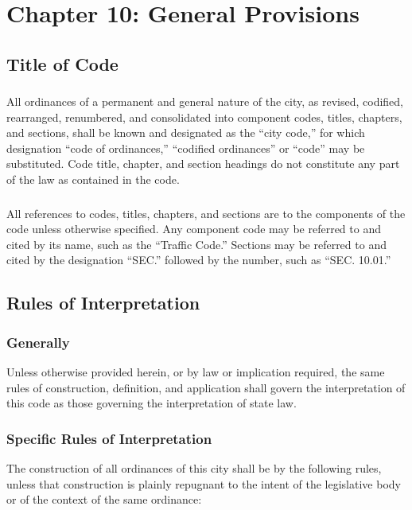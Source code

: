 %
\chapter*{Chapter 10: \newline
	General Provisions}


\section{Title of Code}
\subsection{}
All ordinances of a permanent and general nature of the city, as revised, codified, rearranged, renumbered, and consolidated into component codes, titles, chapters, and sections, shall be known and designated as the “city code,” for which designation “code of ordinances,” “codified ordinances” or “code” may be substituted.  Code title, chapter, and section headings do not constitute any part of the law as contained in the code.
\subsection{}
All references to codes, titles, chapters, and sections are to the components of the code unless otherwise specified.  Any component code may be referred to and cited by its name, such as the “Traffic Code.”  Sections may be referred to and cited by the designation “SEC.” followed by the number, such as “SEC. 10.01.”


\section{Rules of Interpretation}
\subsection{Generally}
Unless otherwise provided herein, or by law or implication required, the same rules of construction, definition, and application shall govern the interpretation of this code as those governing the interpretation of state law.
\subsection{Specific Rules of Interpretation}
The construction of all ordinances of this city shall be by the following rules, unless that construction is plainly repugnant to the intent of the legislative body or of the context of the same ordinance:
